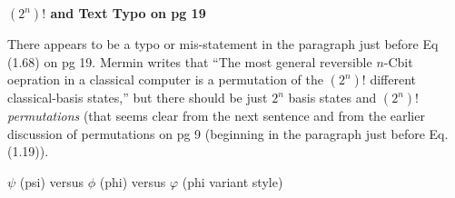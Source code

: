 \documentclass{article}
\begin{document}

\vspace{0.25in}

\textbf{$(2^n)!$ and Text Typo on pg 19}\par

\vspace{0.25in}

There appears to be a typo or mis-statement in the paragraph just before Eq (1.68) on pg 19. Mermin writes that ``The most general reversible $n$-Cbit oepration in a classical computer is a permutation of the $(2^n)!$ different classical-basis states,'' but there should be just $2^n$ basis states and $(2^n)!$ \textit{permutations} (that seems clear from the next sentence and from the earlier discussion of permutations on pg 9 (beginning in the paragraph just before Eq. (1.19)).

\vspace{0.25in}

$\psi$ (psi) versus $\phi$ (phi) versus $\varphi$ (phi variant style)



\printbibliography
\end{document}
